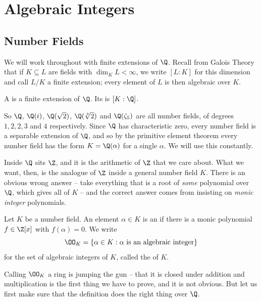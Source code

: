 \section{Algebraic Integers}\label{sec:alg}

\subsection{Number Fields}

We will work throughout with finite extensions of $\Q$. Recall from Galois Theory that if $K \subseteq L$ are fields with $\dim_K L < \infty$, we write $[L:K]$ for this dimension and call $L/K$ a finite extension; every element of $L$ is then algebraic over $K$.

\begin{definition}
	A  is a finite extension of $\Q$. Its  is $[K:\Q]$.
\end{definition}

So $\Q$, $\Q(i)$, $\Q(\sqrt{2})$, $\Q(\sqrt[3]{2})$ and $\Q(\zeta_5)$ are all number fields, of degrees $1, 2, 2, 3$ and $4$ respectively. Since $\Q$ has characteristic zero, every number field is a separable extension of $\Q$, and so by the primitive element theorem every number field has the form $K = \Q(\alpha)$ for a single $\alpha$. We will use this constantly.

Inside $\Q$ sits $\Z$, and it is the arithmetic of $\Z$ that we care about. What we want, then, is the analogue of $\Z$ inside a general number field $K$. There is an obvious wrong answer -- take everything that is a root of \emph{some} polynomial over $\Q$, which gives all of $K$ -- and the correct answer comes from insisting on \emph{monic integer} polynomials.

\begin{definition}
	Let $K$ be a number field. An element $\alpha \in K$ is an  if there is a monic polynomial $f \in \Z[x]$ with $f(\alpha) = 0$. We write
	$$\OO_K = \{\alpha \in K : \alpha \text{ is an algebraic integer}\}$$
	for the set of algebraic integers of $K$, called the  of $K$.
\end{definition}

Calling $\OO_K$ a ring is jumping the gun -- that it is closed under addition and multiplication is the first thing we have to prove, and it is not obvious. But let us first make sure that the definition does the right thing over $\Q$.

